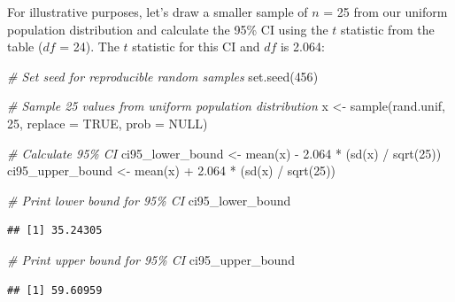 \documentclass[
]{book}
\newenvironment{Shaded}{\begin{snugshade}}{\end{snugshade}}
\newcommand{\AttributeTok}[1]{\textcolor[rgb]{0.77,0.63,0.00}{#1}}
\newcommand{\CommentTok}[1]{\textcolor[rgb]{0.56,0.35,0.01}{\textit{#1}}}
\newcommand{\ConstantTok}[1]{\textcolor[rgb]{0.00,0.00,0.00}{#1}}
\newcommand{\DecValTok}[1]{\textcolor[rgb]{0.00,0.00,0.81}{#1}}
\newcommand{\FloatTok}[1]{\textcolor[rgb]{0.00,0.00,0.81}{#1}}
\newcommand{\FunctionTok}[1]{\textcolor[rgb]{0.00,0.00,0.00}{#1}}
\newcommand{\NormalTok}[1]{#1}
\newcommand{\OtherTok}[1]{\textcolor[rgb]{0.56,0.35,0.01}{#1}}
\newcommand{\SpecialCharTok}[1]{\textcolor[rgb]{0.00,0.00,0.00}{#1}}
\begin{document}
For illustrative purposes, let's draw a smaller sample of \(n\) = 25 from our uniform population distribution and calculate the 95\% CI using the \(t\) statistic from the table (\(df\) = 24). The \(t\) statistic for this CI and \(df\) is 2.064:

\begin{Shaded}
\begin{Highlighting}[]
\CommentTok{\# Set seed for reproducible random samples}
\FunctionTok{set.seed}\NormalTok{(}\DecValTok{456}\NormalTok{)}

\CommentTok{\# Sample 25 values from uniform population distribution}
\NormalTok{x }\OtherTok{\textless{}{-}} \FunctionTok{sample}\NormalTok{(rand.unif, }\DecValTok{25}\NormalTok{, }\AttributeTok{replace =} \ConstantTok{TRUE}\NormalTok{, }\AttributeTok{prob =} \ConstantTok{NULL}\NormalTok{)}

\CommentTok{\# Calculate 95\% CI}
\NormalTok{ci95\_lower\_bound }\OtherTok{\textless{}{-}} \FunctionTok{mean}\NormalTok{(x) }\SpecialCharTok{{-}} \FloatTok{2.064} \SpecialCharTok{*}\NormalTok{ (}\FunctionTok{sd}\NormalTok{(x) }\SpecialCharTok{/} \FunctionTok{sqrt}\NormalTok{(}\DecValTok{25}\NormalTok{))}
\NormalTok{ci95\_upper\_bound }\OtherTok{\textless{}{-}} \FunctionTok{mean}\NormalTok{(x) }\SpecialCharTok{+} \FloatTok{2.064} \SpecialCharTok{*}\NormalTok{ (}\FunctionTok{sd}\NormalTok{(x) }\SpecialCharTok{/} \FunctionTok{sqrt}\NormalTok{(}\DecValTok{25}\NormalTok{))}
\end{Highlighting}
\end{Shaded}

\begin{Shaded}
\begin{Highlighting}[]
\CommentTok{\# Print lower bound for 95\% CI}
\NormalTok{ci95\_lower\_bound}
\end{Highlighting}
\end{Shaded}

\begin{verbatim}
## [1] 35.24305
\end{verbatim}

\begin{Shaded}
\begin{Highlighting}[]
\CommentTok{\# Print upper bound for 95\% CI}
\NormalTok{ci95\_upper\_bound}
\end{Highlighting}
\end{Shaded}

\begin{verbatim}
## [1] 59.60959
\end{verbatim}
\end{document}
